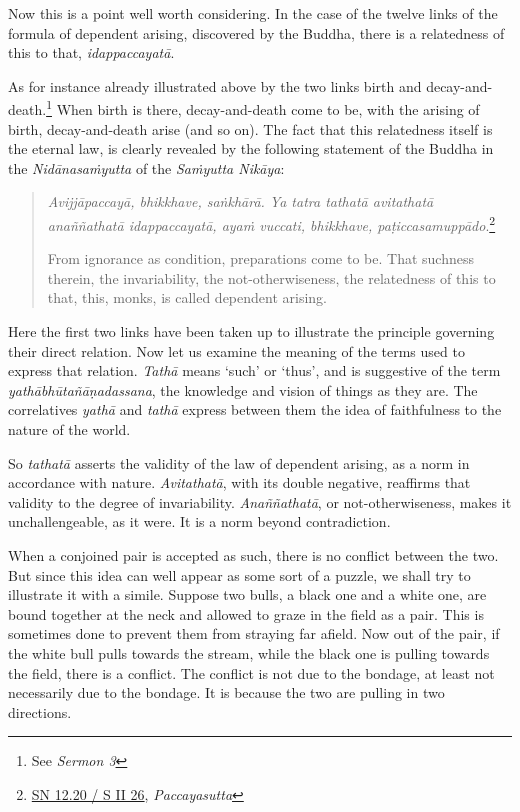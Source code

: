 Now this is a point well worth considering. In the case of the twelve links of the formula of dependent arising, discovered by the Buddha, there is a relatedness of this to that, \emph{idappaccayatā}.

As for instance already illustrated above by the two links birth and decay-and-death.\footnote{See \emph{Sermon 3}} When birth is there, decay-and-death come to be, with the arising of birth, decay-and-death arise (and so on). The fact that this relatedness itself is the eternal law, is clearly revealed by the following statement of the Buddha in the \emph{Nidānasaṁyutta} of the \emph{Saṁyutta Nikāya}:

\begin{quote}
\emph{Avijjāpaccayā, bhikkhave, saṅkhārā. Ya tatra tathatā avitathatā anaññathatā idappaccayatā, ayaṁ vuccati, bhikkhave, paṭiccasamuppādo}.\footnote{\href{https://suttacentral.net/sn12.20/pli/ms}{SN 12.20 / S II 26}, \emph{Paccayasutta}}

From ignorance as condition, preparations come to be. That suchness therein, the invariability, the not-otherwiseness, the relatedness of this to that, this, monks, is called dependent arising.
\end{quote}

Here the first two links have been taken up to illustrate the principle governing their direct relation. Now let us examine the meaning of the terms used to express that relation. \emph{Tathā} means `such' or `thus', and is suggestive of the term \emph{yathābhūtañāṇadassana}, the knowledge and vision of things as they are. The correlatives \emph{yathā} and \emph{tathā} express between them the idea of faithfulness to the nature of the world.

So \emph{tathatā} asserts the validity of the law of dependent arising, as a norm in accordance with nature. \emph{Avitathatā}, with its double negative, reaffirms that validity to the degree of invariability. \emph{Anaññathatā}, or not-otherwiseness, makes it unchallengeable, as it were. It is a norm beyond contradiction.

When a conjoined pair is accepted as such, there is no conflict between the two. But since this idea can well appear as some sort of a puzzle, we shall try to illustrate it with a simile. Suppose two bulls, a black one and a white one, are bound together at the neck and allowed to graze in the field as a pair. This is sometimes done to prevent them from straying far afield. Now out of the pair, if the white bull pulls towards the stream, while the black one is pulling towards the field, there is a conflict. The conflict is not due to the bondage, at least not necessarily due to the bondage. It is because the two are pulling in two directions.

